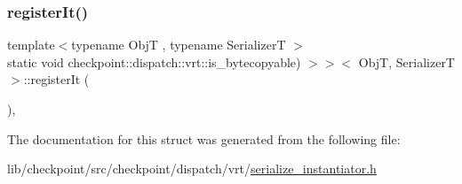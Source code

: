 \subsubsection{\texorpdfstring{register\+It()}{registerIt()}}
{\footnotesize\ttfamily template$<$typename ObjT , typename SerializerT $>$ \\
static void checkpoint\+::dispatch\+::vrt\+::is\+\_\+bytecopyable) $>$$>$$<$ ObjT, SerializerT $>$\+::register\+It (\begin{DoxyParamCaption}{ }\end{DoxyParamCaption})\hspace{0.3cm}{\ttfamily [inline]}, {\ttfamily [static]}}



The documentation for this struct was generated from the following file\+:\begin{DoxyCompactItemize}
\item 
lib/checkpoint/src/checkpoint/dispatch/vrt/\hyperlink{serialize__instantiator_8h}{serialize\+\_\+instantiator.\+h}\end{DoxyCompactItemize}
